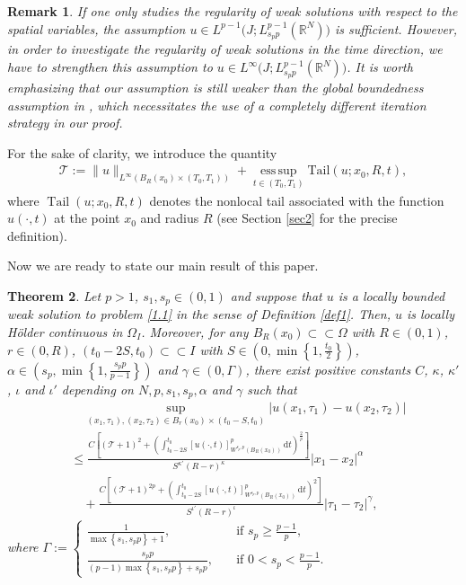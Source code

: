 \documentclass[reqno,10pt]{amsart}
\numberwithin{equation}{section}
\newtheorem{theorem}{Theorem}[section]
\newtheorem{remark}[theorem]{Remark}
\begin{document}
\begin{remark}
	\label{rem28}
	If one only studies the regularity of weak solutions with respect to the spatial variables, the assumption $u\in L^{p-1}\bigl(J;L^{p-1}_{s_p p}(\mathbb{R}^N)\bigl)$ is sufficient. However, in order to investigate the regularity of weak solutions in the time direction, we have to strengthen this assumption to $u\in L^{\infty}\bigl(J;L^{p-1}_{s_pp}(\mathbb{R}^N)\bigl)$. It is worth emphasizing that our assumption is still weaker than the global boundedness assumption in \cite{BLS21}, which necessitates the use of a completely different iteration strategy in our proof.
\end{remark}

For the sake of clarity, we introduce the quantity
\begin{align*}
	\mathcal{T}:=\|u\|_{L^\infty(B_{R}(x_0)\times(T_0,T_1))}+\operatorname*{ess\,sup}_{t\in(T_0,T_1)}\mathrm{Tail}(u;x_0,R,t),
\end{align*}
where $\operatorname{Tail}(u; x_0, R,t)$ denotes the nonlocal tail associated with the function $u(\cdot,t)$ at the point $x_0$ and radius $R$ (see Section \ref{sec2} for the precise definition).

\smallskip

Now we are ready to state our main result of this paper.

\begin{theorem}
	\label{th27}
	Let $p>1$, $s_1,s_p\in(0,1)$ and suppose that $u$ is a locally bounded weak solution to problem \eqref{1.1} in the sense of Definition \ref{def1}. Then, $u$ is locally H\"{o}lder continuous in $\Omega_I$. Moreover, for any $B_R(x_0)\subset\subset\Omega$ with $R\in(0,1)$, $r\in(0,R)$, $(t_0-2S,t_0)\subset\subset I$ with $S\in\left( 0,\min\left\lbrace1,\frac{t_0}{2} \right\rbrace \right) $, $\alpha\in \left( s_p,\min\left\lbrace 1,\frac{s_pp}{p-1}\right\rbrace \right) $ and $\gamma\in\left( 0,\Gamma\right)$, there exist positive constants $C$, $\kappa$, $\kappa'$, $\iota$ and $\iota'$ depending on $N, p, s_1, s_p, \alpha$ and $\gamma$ such that
	\begin{align*}
		&\quad\sup_{(x_1, \tau_1),(x_2, \tau_2)\in B_r(x_0)\times(t_0-S, t_0)}|u(x_1, \tau_1)-u(x_2, \tau_2)|\\
		&\le \frac{C\left[ \left( \mathcal{T}+1\right)^2+\left( \int_{t_0-2S}^{t_0}[u(\cdot,t)]^p_{W^{s_p, p}(B_R(x_0))}\,\mathrm{d}t\right) ^\frac{2}{p}\right] }{S^{\kappa'}(R-r)^{\kappa}}|x_1-x_2|^{\alpha}\\
		&\quad+\frac{C\left[ \left( \mathcal{T}+1\right)^{2p}+\left( \int_{t_0-2S}^{t_0}[u(\cdot,t)]^p_{W^{s_p,p}(B_R(x_0))}\,\mathrm{d}t\right) ^2\right] }{S^{\iota'}(R-r)^{\iota}}|\tau_1-\tau_2|^\gamma,
	\end{align*}
	where $\Gamma:=\begin{cases}
		\frac{1}{\max\left\lbrace s_1, s_pp\right\rbrace+1},\quad&\text{if }s_p\ge\frac{p-1}{p},\\[2mm]
		\frac{s_pp}{(p-1)\max\left\lbrace s_1,s_pp\right\rbrace+s_pp},\quad&\text{if }0<s_p<\frac{p-1}{p}.
	\end{cases}$
\end{theorem}
\end{document}
